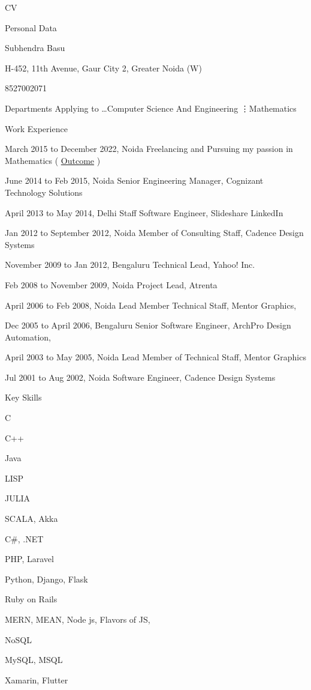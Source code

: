 \documentclass{scrartcl}
\begin{document}
\begin{cv}{CV}
\begin{cvlist}{Personal Data}
\item Subhendra Basu
\item H-452, 11th Avenue, Gaur City 2, Greater Noida (W)
\item 8527002071
\item Departments Applying to \ldots Computer Science And Engineering \vdots Mathematics
\end{cvlist}

\begin{cvlist}{Work Experience}
\item{March 2015 to December 2022, Noida} Freelancing and Pursuing my passion in Mathematics
	( \href{https://www.dropbox.com/s/8hrsvfw2y9r5f6f/final%20manuscript%202003%2C2022.pdf?dl=0}{Outcome} )
\item{June 2014 to Feb 2015, Noida} 
	Senior Engineering Manager, Cognizant Technology Solutions
\item{April 2013 to May 2014, Delhi}
	Staff Software Engineer, Slideshare LinkedIn
\item{Jan 2012 to September 2012, Noida} 
	Member of Consulting Staff, Cadence Design Systems
\item{November 2009 to Jan 2012, Bengaluru} 
	Technical Lead, Yahoo! Inc.
\item{Feb 2008 to November 2009, Noida} 
	Project Lead, Atrenta
\item{April 2006 to Feb 2008, Noida} 
	Lead Member Technical Staff, Mentor Graphics, 
\item{Dec 2005 to April 2006, Bengaluru} 
	Senior Software Engineer, ArchPro Design Automation,
\item{April 2003 to May 2005, Noida} 
	Lead Member of Technical Staff, Mentor Graphics
\item{Jul 2001 to Aug 2002, Noida} 
	Software Engineer, Cadence Design Systems 
\end{cvlist}

\begin{cvlist}{Key Skills}
\item C
\item C++
\item Java
\item LISP
\item JULIA
\item SCALA, Akka
\item C\#, .NET
\item PHP, Laravel
\item Python, Django, Flask
\item Ruby on Rails
\item MERN, MEAN, Node js, Flavors of JS, 
\item NoSQL
\item MySQL, MSQL
\item Xamarin, Flutter
\end{cvlist}


\end{cv}
\end{document}
